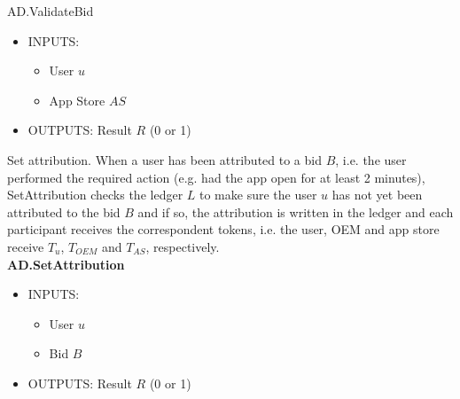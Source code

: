 \textsf{AD.ValidateBid}
\begin{itemize}
	\item INPUTS:
	\begin{itemize}
		\item User $u$
		\item App Store $AS$
	\end{itemize}
	\item OUTPUTS: Result $R$ (0 or 1)
\end{itemize}

\noindent \textsf{Set attribution}. When a user has been attributed to a bid $B$, i.e. the user performed the required action (e.g. had the app open for at least 2 minutes), \textsf{SetAttribution} checks the ledger $L$ to make sure the user $u$ has not yet been attributed to the bid $B$ and if so, the attribution is written in the ledger and each participant receives the correspondent tokens, i.e. the user, OEM and app store receive $T_u$, $T_{OEM}$ and $T_{AS}$, respectively. \\

\textbf{AD.SetAttribution}
\begin{itemize}
	\item INPUTS:
	\begin{itemize}
		\item User $u$
		\item Bid $B$
	\end{itemize}
	\item OUTPUTS: Result $R$ (0 or 1)
\end{itemize}

